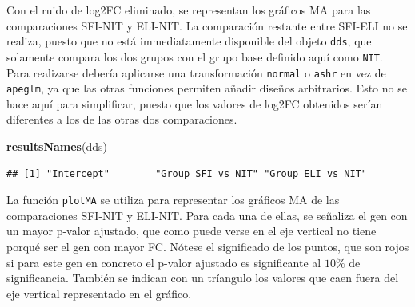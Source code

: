 \documentclass[
]{article}
\newenvironment{Shaded}{\begin{snugshade}}{\end{snugshade}}
\newcommand{\DataTypeTok}[1]{\textcolor[rgb]{0.13,0.29,0.53}{#1}}
\newcommand{\DecValTok}[1]{\textcolor[rgb]{0.00,0.00,0.81}{#1}}
\newcommand{\FloatTok}[1]{\textcolor[rgb]{0.00,0.00,0.81}{#1}}
\newcommand{\KeywordTok}[1]{\textcolor[rgb]{0.13,0.29,0.53}{\textbf{#1}}}
\newcommand{\NormalTok}[1]{#1}
\newcommand{\OperatorTok}[1]{\textcolor[rgb]{0.81,0.36,0.00}{\textbf{#1}}}
\newcommand{\StringTok}[1]{\textcolor[rgb]{0.31,0.60,0.02}{#1}}
\begin{document}
Con el ruido de log2FC eliminado, se representan los gráficos MA para
las comparaciones SFI-NIT y ELI-NIT. La comparación restante entre
SFI-ELI no se realiza, puesto que no está immediatamente disponible del
objeto \texttt{dds}, que solamente compara los dos grupos con el grupo
base definido aquí como \texttt{NIT}. Para realizarse debería aplicarse
una transformación \texttt{normal} o \texttt{ashr} en vez de
\texttt{apeglm}, ya que las otras funciones permiten añadir diseños
arbitrarios. Esto no se hace aquí para simplificar, puesto que los
valores de log2FC obtenidos serían diferentes a los de las otras dos
comparaciones.

\begin{Shaded}
\begin{Highlighting}[]
\KeywordTok{resultsNames}\NormalTok{(dds)}
\end{Highlighting}
\end{Shaded}

\begin{verbatim}
## [1] "Intercept"        "Group_SFI_vs_NIT" "Group_ELI_vs_NIT"
\end{verbatim}

La función \texttt{plotMA} se utiliza para representar los gráficos MA
de las comparaciones SFI-NIT y ELI-NIT. Para cada una de ellas, se
señaliza el gen con un mayor p-valor ajustado, que como puede verse en
el eje vertical no tiene porqué ser el gen con mayor FC. Nótese el
significado de los puntos, que son rojos si para este gen en concreto el
p-valor ajustado es significante al \(10\%\) de significancia. También
se indican con un tríangulo los valores que caen fuera del eje vertical
representado en el gráfico.

\begin{Shaded}
\end{Shaded}
\end{document}
